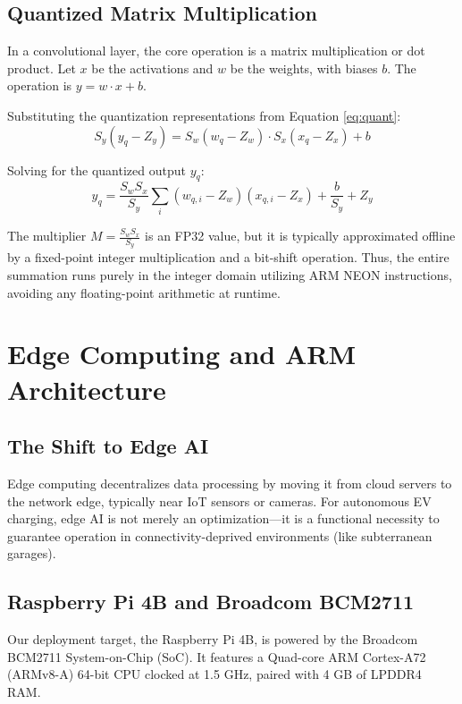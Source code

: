 \documentclass[11pt]{report}
\begin{document}
\subsection{Quantized Matrix Multiplication}
In a convolutional layer, the core operation is a matrix multiplication or dot product. Let $x$ be the activations and $w$ be the weights, with biases $b$. The operation is $y = w \cdot x + b$.

Substituting the quantization representations from Equation \ref{eq:quant}:
\begin{equation}
    S_y (y_q - Z_y) = S_w (w_q - Z_w) \cdot S_x (x_q - Z_x) + b
\end{equation}

Solving for the quantized output $y_q$:
\begin{equation} \label{eq:quant_matmul}
    y_q = \frac{S_w S_x}{S_y} \sum_{i} (w_{q,i} - Z_w)(x_{q,i} - Z_x) + \frac{b}{S_y} + Z_y
\end{equation}

The multiplier $M = \frac{S_w S_x}{S_y}$ is an FP32 value, but it is typically approximated offline by a fixed-point integer multiplication and a bit-shift operation. Thus, the entire summation runs purely in the integer domain utilizing ARM NEON instructions, avoiding any floating-point arithmetic at runtime.

\section{Edge Computing and ARM Architecture}

\subsection{The Shift to Edge AI}
Edge computing decentralizes data processing by moving it from cloud servers to the network edge, typically near IoT sensors or cameras. For autonomous EV charging, edge AI is not merely an optimization---it is a functional necessity to guarantee operation in connectivity-deprived environments (like subterranean garages).

\subsection{Raspberry Pi 4B and Broadcom BCM2711}
Our deployment target, the Raspberry Pi 4B, is powered by the Broadcom BCM2711 System-on-Chip (SoC). It features a Quad-core ARM Cortex-A72 (ARMv8-A) 64-bit CPU clocked at 1.5 GHz, paired with 4 GB of LPDDR4 RAM.
\end{document}
